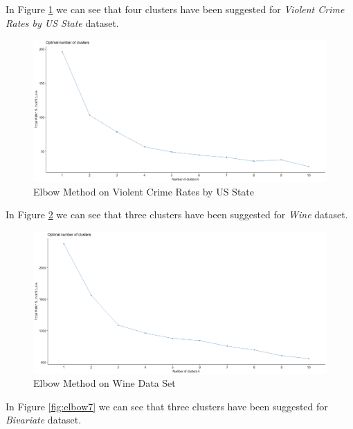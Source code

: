 \begin{itemize}
\vspace{15mm}

In Figure \ref{fig:elbow5} we can see that four clusters have been suggested for \textit{Violent Crime Rates by US State}
dataset.

\begin{figure}[h!]
  \centering
  \includegraphics[scale=1.3]{figures/results/USArrests/elbow.png}
  \caption{Elbow Method on Violent Crime Rates by US State}
  \label{fig:elbow5}
\end{figure}

\newpage


In Figure \ref{fig:elbow6} we can see that three clusters have been suggested for \textit{Wine} dataset.

\begin{figure}[h!]
  \centering
  \includegraphics[scale=1.3]{figures/results/wine/elbow.png}
  \caption{Elbow Method on Wine Data Set}
  \label{fig:elbow6}
\end{figure}

\vspace{15mm}

In Figure \ref{fig:elbow7} we can see that three clusters have been suggested for \textit{Bivariate} dataset.


\end{itemize}
